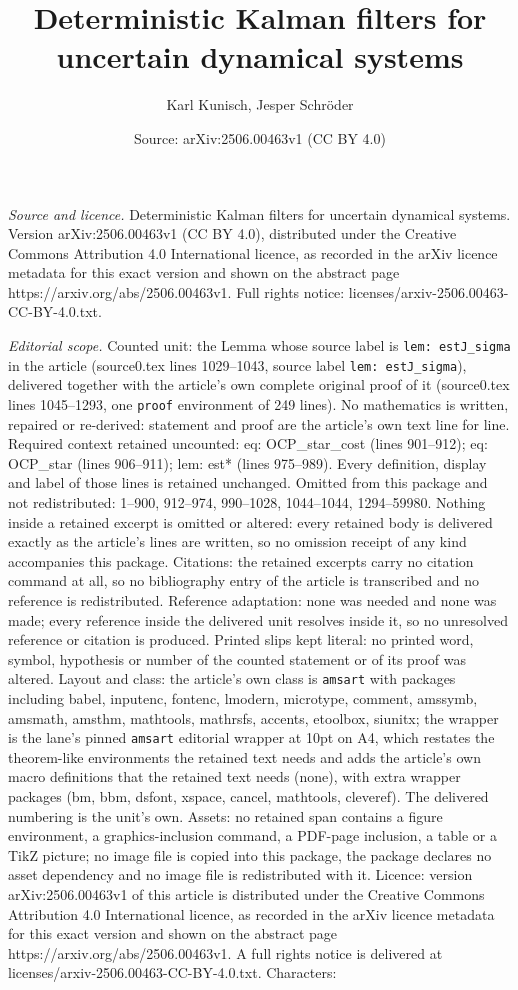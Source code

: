 \documentclass[10pt,a4paper]{amsart}
\title[Deterministic Kalman filters for uncertain dynamical systems]{Deterministic Kalman filters for uncertain dynamical systems}
\author{Karl Kunisch, Jesper Schr\"oder}
\date{Source: arXiv:2506.00463v1 (CC BY 4.0)}
\begin{document}
\maketitle

\noindent\emph{Source and licence.} Deterministic Kalman filters for uncertain dynamical systems. Version arXiv:2506.00463v1 (CC BY 4.0), distributed under the Creative Commons Attribution 4.0 International licence, as recorded in the arXiv licence metadata for this exact version and shown on the abstract page https://arxiv.org/abs/2506.00463v1. Full rights notice: licenses/arxiv-2506.00463-CC-BY-4.0.txt.\par\smallskip

\noindent\textit{Editorial scope.} Counted unit: the Lemma whose source label is \texttt{lem: estJ\_sigma} in the article (source0.tex lines 1029--1043, source label \texttt{lem: estJ\_sigma}), delivered together with the article's own complete original proof of it (source0.tex lines 1045--1293, one \texttt{proof} environment of 249 lines). No mathematics is written, repaired or re-derived: statement and proof are the article's own text line for line. Required context retained uncounted: eq: OCP\_star\_cost (lines 901--912); eq: OCP\_star (lines 906--911); lem: est* (lines 975--989). Every definition, display and label of those lines is retained unchanged. Omitted from this package and not redistributed: 1--900, 912--974, 990--1028, 1044--1044, 1294--59980. Nothing inside a retained excerpt is omitted or altered: every retained body is delivered exactly as the article's lines are written, so no omission receipt of any kind accompanies this package. Citations: the retained excerpts carry no citation command at all, so no bibliography entry of the article is transcribed and no reference is redistributed. Reference adaptation: none was needed and none was made; every reference inside the delivered unit resolves inside it, so no unresolved reference or citation is produced. Printed slips kept literal: no printed word, symbol, hypothesis or number of the counted statement or of its proof was altered. Layout and class: the article's own class is \texttt{amsart} with packages including babel, inputenc, fontenc, lmodern, microtype, comment, amssymb, amsmath, amsthm, mathtools, mathrsfs, accents, etoolbox, siunitx; the wrapper is the lane's pinned \texttt{amsart} editorial wrapper at 10pt on A4, which restates the theorem-like environments the retained text needs and adds the article's own macro definitions that the retained text needs (none), with extra wrapper packages (bm, bbm, dsfont, xspace, cancel, mathtools, cleveref). The delivered numbering is the unit's own. Assets: no retained span contains a figure environment, a graphics-inclusion command, a PDF-page inclusion, a table or a TikZ picture; no image file is copied into this package, the package declares no asset dependency and no image file is redistributed with it. Licence: version arXiv:2506.00463v1 of this article is distributed under the Creative Commons Attribution 4.0 International licence, as recorded in the arXiv licence metadata for this exact version and shown on the abstract page https://arxiv.org/abs/2506.00463v1. A full rights notice is delivered at licenses/arxiv-2506.00463-CC-BY-4.0.txt. Characters: 
\end{document}
